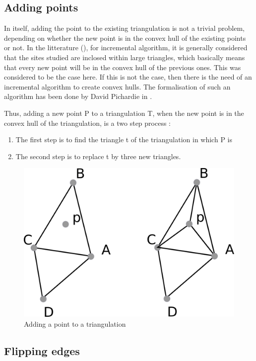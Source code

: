 \documentclass[a4paper,10pt]{article}
\begin{document}
\subsection{Adding points}

In itself, adding the point to the existing triangulation is not a trivial problem, depending on whether the new point is in the convex hull of the existing points or not. In the litterature (\cite{Del}), for incremental algorithm, it is generally considered that the sites studied are inclosed within large triangles, which basically means that every new point will be in the convex hull of the previous ones. This was considered to be the case here. If this is not the case, then there is the need of an incremental algorithm to create convex hulls. The formalisation of such an algorithm has been done by David Pichardie in \cite{Hull}.

Thus, adding a new point P to a triangulation T, when the new point is in the convex hull of the triangulation, is a two step process :
\begin{enumerate}
\item The first step is to find the triangle t of the triangulation in which P is 
\item The second step is to replace t by three new triangles.
\end{enumerate}
\begin{figure}[h]
\centering
\caption{Adding a point to a triangulation}
\includegraphics[scale=1]{adding} 
\end{figure}
\subsection{Flipping edges}
\end{document}
